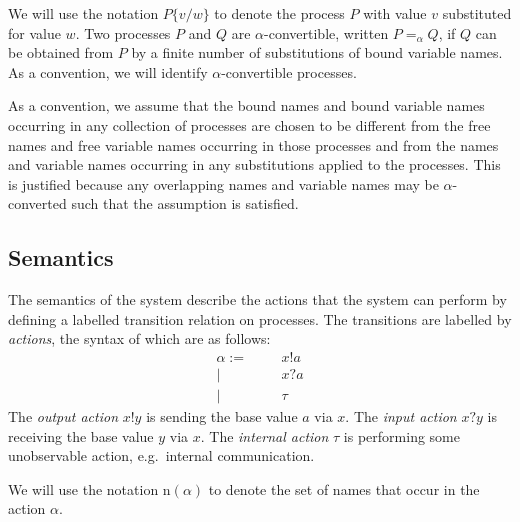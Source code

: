 \documentclass[a4paper]{article}
\newcommand{\names}[1]{\textrm{n}(#1)}
\newcommand{\alphacon}[2]{#1 =_{\alpha} #2}
\newcommand{\subst}[3]{#1\{#2/#3\}}
\newcommand{\Aoutf}[2]{#1 ! #2}
\newcommand{\Ain}[2]{#1 ? #2}
\newcommand{\Atau}{\tau}
\begin{document}
We will use the notation \( \subst{P}{v}{w} \) to denote the process \( P \) with value \( v \) substituted for value \( w \).
Two processes \( P \) and \( Q \) are \( \alpha \)-convertible, written \( \alphacon{P}{Q} \), if \( Q \) can be obtained from \( P \) by a finite number of substitutions of bound variable names.
As a convention, we will identify \( \alpha \)-convertible processes.

As a convention, we assume that the bound names and bound variable names occurring in any collection of processes are chosen to be different from the free names and free variable names occurring in those processes and from the names and variable names occurring in any substitutions applied to the processes.
This is justified because any overlapping names and variable names may be \( \alpha \)-converted such that the assumption is satisfied.

\subsection{Semantics}
The semantics of the system describe the actions that the system can perform by defining a labelled transition relation on processes.
The transitions are labelled by \emph{actions}, the syntax of which are as follows:
\begin{align*}
  \alpha := &&& \Aoutf{x}{a} \\
  |&&& \Ain{x}{a} \\
  |&&& \Atau
\end{align*}
The \emph{output action} \( \Aoutf{x}{y} \) is sending the base value \( a \) via \( x \).
The \emph{input action} \( \Ain{x}{y} \) is receiving the base value \( y \) via \( x \).
The \emph{internal action} \( \Atau \) is performing some unobservable action, e.g.\ internal communication.

We will use the notation \( \names{\alpha} \) to denote the set of names that occur in the action \( \alpha \).
\end{document}
